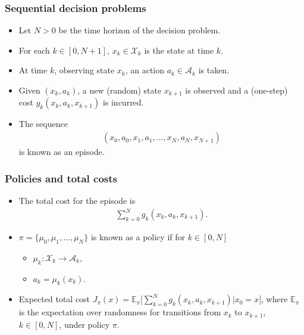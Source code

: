 \documentclass{beamer}
\def\E{{\mathbb E}}
\begin{document}
\begin{frame}
  \frametitle{Sequential decision problems}
  \begin{itemize}
  \item Let $N>0$  be the time horizon of the decision problem.
  \item For each $k\in [0, N+1]$, $x_k\in \mathcal{X}_k$ is the state at time $k$.
  \item At time $k$, observing state $x_k$, an action $a_k\in \mathcal{A}_k$ is taken.
  \item Given $(x_k, a_k)$, a new (random) state $x_{k+1}$ is observed and
   a (one-step) cost $g_k(x_k, a_k, x_{k+1})$ is incurred.
  \item The sequence
    \begin{align*}
      (x_0, a_0, x_1, a_1, \ldots, x_N, a_N, x_{N+1})
    \end{align*}
    is known as an episode.


  \end{itemize}



\end{frame}
\begin{frame}
  \frametitle{Policies and total costs}
  \begin{itemize}
  \item The total cost for the episode is
    \begin{align*}
      \sum_{k=0}^N g_k(x_k, a_k, x_{k+1}).
    \end{align*}

  \item $ \pi=\{\mu_0, \mu_1, \ldots, \mu_N\}$ is known as a policy if
    for    $ k \in [0, N]$
    \begin{itemize}
    \item     $\mu_k: \mathcal{X}_k\to \mathcal{A}_k$,
     \item  $a_k = \mu_k(x_k)$.
    \end{itemize}

  \item Expected total cost $J_\pi(x) = \E_{\pi}\Big[\sum\limits_{k=0}^N g_k(x_k, a_k, x_{k+1})| x_0=x \Big]$,
 where $\E_{\pi}$ is the expectation over randomness for transitions from $x_k$ to
  $x_{k+1}$,  $k\in [0, N]$,  under policy $\pi$.

  \end{itemize}
\end{frame}
\end{document}
